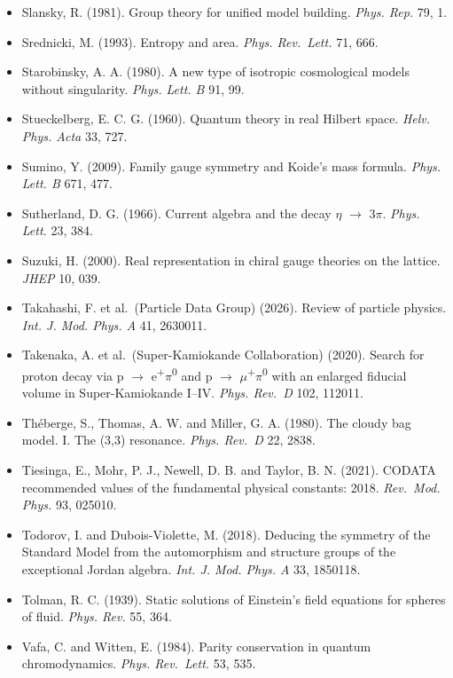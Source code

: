 \documentclass[
  11pt,
]{article}
\begin{document}
\begin{itemize}
\item
  Slansky, R. (1981). Group theory for unified model building. \emph{Phys. Rep.} 79, 1.
\item
  Srednicki, M. (1993). Entropy and area. \emph{Phys. Rev.~Lett.} 71, 666.
\item
  Starobinsky, A. A. (1980). A new type of isotropic cosmological models without singularity. \emph{Phys. Lett. B} 91, 99.
\item
  Stueckelberg, E. C. G. (1960). Quantum theory in real Hilbert space. \emph{Helv. Phys. Acta} 33, 727.
\item
  Sumino, Y. (2009). Family gauge symmetry and Koide's mass formula. \emph{Phys. Lett. B} 671, 477.
\item
  Sutherland, D. G. (1966). Current algebra and the decay \ensuremath{\eta} \ensuremath{\to} 3\ensuremath{\pi}. \emph{Phys. Lett.} 23, 384.
\item
  Suzuki, H. (2000). Real representation in chiral gauge theories on the lattice. \emph{JHEP} 10, 039.
\item
  Takahashi, F. et al.~(Particle Data Group) (2026). Review of particle physics. \emph{Int. J. Mod. Phys. A} 41, 2630011.
\item
  Takenaka, A. et al.~(Super-Kamiokande Collaboration) (2020). Search for proton decay via p \ensuremath{\to} e\textsuperscript{+}\ensuremath{\pi}\textsuperscript{0} and p \ensuremath{\to} \ensuremath{\mu}\textsuperscript{+}\ensuremath{\pi}\textsuperscript{0} with an enlarged fiducial volume in Super-Kamiokande I--IV. \emph{Phys. Rev.~D} 102, 112011.
\item
  Théberge, S., Thomas, A. W. and Miller, G. A. (1980). The cloudy bag model. I. The (3,3) resonance. \emph{Phys. Rev.~D} 22, 2838.
\item
  Tiesinga, E., Mohr, P. J., Newell, D. B. and Taylor, B. N. (2021). CODATA recommended values of the fundamental physical constants: 2018. \emph{Rev.~Mod. Phys.} 93, 025010.
\item
  Todorov, I. and Dubois-Violette, M. (2018). Deducing the symmetry of the Standard Model from the automorphism and structure groups of the exceptional Jordan algebra. \emph{Int. J. Mod. Phys. A} 33, 1850118.
\item
  Tolman, R. C. (1939). Static solutions of Einstein's field equations for spheres of fluid. \emph{Phys. Rev.} 55, 364.
\item
  Vafa, C. and Witten, E. (1984). Parity conservation in quantum chromodynamics. \emph{Phys. Rev.~Lett.} 53, 535.

\end{itemize}
\end{document}
